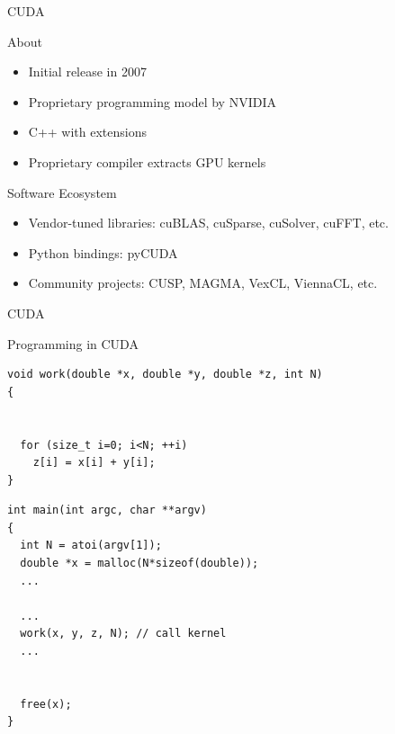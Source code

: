 


\begin{frame}[fragile]{CUDA}
 
 \begin{block}{About}
  \begin{itemize}
   \item Initial release in 2007
   \item Proprietary programming model by NVIDIA
   \item C++ with extensions
   \item Proprietary compiler extracts GPU kernels
  \end{itemize}
 \end{block}

 \begin{block}{Software Ecosystem}
  \begin{itemize}
   \item Vendor-tuned libraries: cuBLAS, cuSparse, cuSolver, cuFFT, etc.
   \item Python bindings: pyCUDA
   \item Community projects: CUSP, MAGMA, VexCL, ViennaCL, etc.
  \end{itemize}
 \end{block}

\end{frame}


\begin{frame}[fragile]{CUDA}
 
 \begin{block}{Programming in CUDA}
  \begin{lstlisting}
void work(double *x, double *y, double *z, int N)
{


  for (size_t i=0; i<N; ++i)
    z[i] = x[i] + y[i];
}
  \end{lstlisting}
  \begin{lstlisting}
int main(int argc, char **argv)
{
  int N = atoi(argv[1]);
  double *x = malloc(N*sizeof(double));
  ...
  
  ...
  work(x, y, z, N); // call kernel
  ...
 
 
  free(x);
}  
  \end{lstlisting}
 \end{block}
\end{frame}


